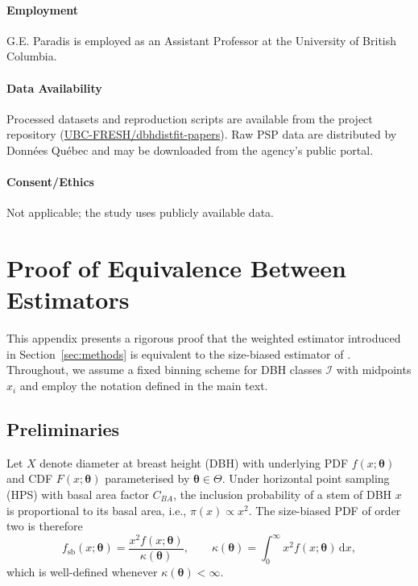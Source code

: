 \documentclass[12pt]{article}
\begin{document}
\paragraph{Employment} G.E. Paradis is employed as an Assistant Professor at the University of British Columbia.\\
\paragraph{Data Availability} Processed datasets and reproduction scripts are available from the project repository (\href{https://github.com/UBC-FRESH/dbhdistfit-papers}{UBC-FRESH/dbhdistfit-papers}). Raw PSP data are distributed by Donn\'ees Qu\'ebec and may be downloaded from the agency's public portal.\\
\paragraph{Consent/Ethics} Not applicable; the study uses publicly available data.\\
\appendix
\section{Proof of Equivalence Between Estimators}
\label{sec:appendix-equivalence}

This appendix presents a rigorous proof that the weighted estimator introduced
in Section~\ref{sec:methods} is equivalent to the size-biased estimator of
\citet{van1986, ducey2015}. Throughout, we assume a fixed binning scheme for
DBH classes $\mathcal{I}$ with midpoints $x_i$ and employ the notation defined
in the main text.

\subsection{Preliminaries}

Let $X$ denote diameter at breast height (DBH) with underlying PDF
$f(x;\boldsymbol{\theta})$ and CDF $F(x;\boldsymbol{\theta})$ parameterised by
$\boldsymbol{\theta}\in\Theta$. Under horizontal point sampling (HPS) with basal
area factor $C_{BA}$, the inclusion probability of a stem of DBH $x$ is
proportional to its basal area, i.e., $\pi(x)\propto x^2$. The size-biased PDF
of order two is therefore
\begin{equation}
  f_{\mathrm{sb}}(x;\boldsymbol{\theta})
  =
  \frac{x^{2} f(x;\boldsymbol{\theta})}{\kappa(\boldsymbol{\theta})},
  \qquad
  \kappa(\boldsymbol{\theta})
  =
  \int_{0}^{\infty} x^{2} f(x;\boldsymbol{\theta})\,\mathrm{d}x,
\end{equation}
which is well-defined whenever $\kappa(\boldsymbol{\theta}) < \infty$.
\end{document}
